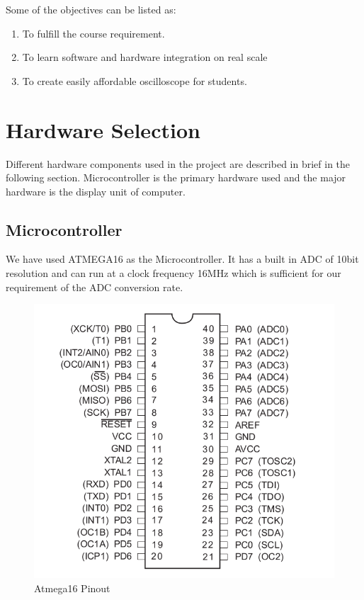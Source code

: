 \documentclass[11pt,a4paper]{article}
\begin{document}
Some of the objectives can be listed as:\\
\begin{enumerate}
	\item To fulfill the course requirement.
	\item To learn software and hardware integration on real scale
	\item To create easily affordable oscilloscope for students.
\end{enumerate}

\section{Hardware Selection}
Different hardware components used in the project are described in brief in the following section. Microcontroller is the primary hardware used and the major hardware is the display unit of computer.
\subsection{Microcontroller}
We have used ATMEGA16 as the Microcontroller. It has a built in ADC of 10bit resolution and can run at a clock frequency 16MHz which is sufficient for our requirement of the ADC conversion rate.

\begin{figure}[h]	
	\centering
	\includegraphics[scale=.35]{Images/Atmega16PinOut.png}
	\caption{Atmega16 Pinout}
	\label{fig:PinOut}
\end{figure}
\end{document}

